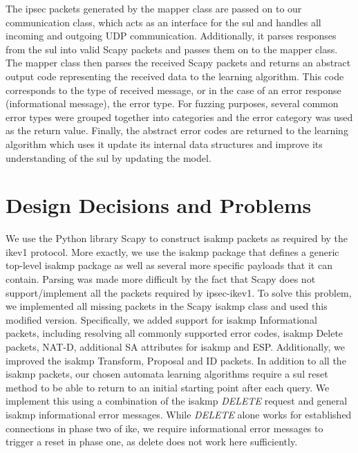 The \ac{ipsec} packets generated by the mapper class are passed on to our communication class, which acts as an interface for the \ac{sul} and handles all incoming and outgoing UDP communication. Additionally, it parses responses from the \ac{sul} into valid Scapy packets and passes them on to the mapper class. The mapper class then parses the received Scapy packets and returns an abstract output code representing the received data to the learning algorithm. This code corresponds to the type of received message, or in the case of an error response (informational message), the error type. For fuzzing purposes, several common error types were grouped together into categories and the error category was used as the return value. Finally, the abstract error codes are returned to the learning algorithm which uses it update its internal data structures and improve its understanding of the \ac{sul} by updating the model. \\

\section{Design Decisions and Problems} \label{subsec:design}
We use the Python library Scapy to construct \ac{isakmp} packets as required by the \ac{ike}v1 protocol. More exactly, we use the \ac{isakmp} package that defines a generic top-level \ac{isakmp} package as well as several more specific payloads that it can contain. Parsing was made more difficult by the fact that Scapy does not support/implement all the packets required by \ac{ipsec}-\ac{ike}v1. To solve this problem, we implemented all missing packets in the Scapy \ac{isakmp} class and used this modified version. Specifically, we added support for \ac{isakmp} Informational packets, including resolving all commonly supported error codes, \ac{isakmp} Delete packets, NAT-D, additional SA attributes for \ac{isakmp} and ESP. Additionally, we improved the \ac{isakmp} Transform, Proposal and ID packets. In addition to all the \ac{isakmp} packets, our chosen automata learning algorithms require a \ac{sul} reset method to be able to return to an initial starting point after each query. We implement this using a combination of the \ac{isakmp} \emph{DELETE} request and general \ac{isakmp} informational error messages. While \emph{DELETE} alone works for established connections in phase two of \ac{ike}, we require informational error messages to trigger a reset in phase one, as delete does not work here sufficiently.

